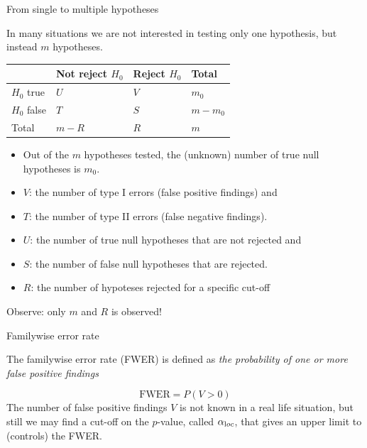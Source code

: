 \documentclass[
  ignorenonframetext,
]{beamer}
\providecommand{\tightlist}{%
  \setlength{\itemsep}{0pt}\setlength{\parskip}{0pt}}
\begin{document}
\begin{frame}

\begin{block}{From single to multiple hypotheses}

In many situations we are not interested in testing only one hypothesis,
but instead \(m\) hypotheses.

\begin{longtable}[]{@{}llll@{}}
\toprule
& Not reject \(H_0\) & Reject \(H_0\) & Total\tabularnewline
\midrule
\endhead
\(H_0\) true & \(U\) & \(V\) & \(m_0\)\tabularnewline
\(H_0\) false & \(T\) & \(S\) & \(m - m_0\)\tabularnewline
Total & \(m-R\) & \(R\) & \(m\)\tabularnewline
\bottomrule
\end{longtable}

\begin{itemize}
\tightlist
\item
  Out of the \(m\) hypotheses tested, the (unknown) number of true null
  hypotheses is \(m_0\).
\item
  \(V\): the number of type I errors (false positive findings) and
\item
  \(T\): the number of type II errors (false negative findings).
\item
  \(U\): the number of true null hypotheses that are not rejected and
\item
  \(S\): the number of false null hypotheses that are rejected.
\item
  \(R\): the number of hypoteses rejected for a specific cut-off
\end{itemize}

Observe: only \(m\) and \(R\) is observed!

\end{block}

\end{frame}

\begin{frame}

\begin{block}{Familywise error rate}

The familywise error rate (FWER) is defined as \emph{the probability of
one or more false positive findings}

\[ \text{FWER} = P(V > 0) \] The number of false positive findings \(V\)
is not known in a real life situation, but still we may find a cut-off
on the \(p\)-value, called \(\alpha_{\text loc}\), that gives an upper
limit to (controls) the FWER.

\end{block}

\end{frame}
\end{document}
